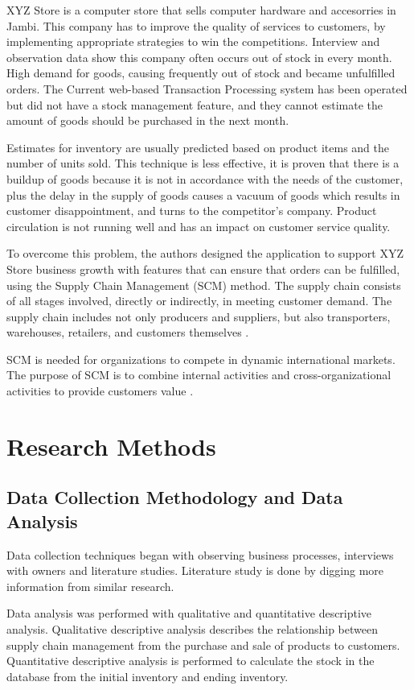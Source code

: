 \documentclass[12pt,a4paper,final]{iopart}
\begin{document}
XYZ Store is a computer store that sells computer hardware and accesorries in Jambi. This company has to improve the quality of services to customers, by implementing appropriate strategies to win the competitions. Interview and observation data show this company often occurs out of stock in every month. High demand for goods, causing frequently out of stock and became unfulfilled orders. The Current web-based Transaction Processing system has been operated but did not have a stock management feature, and they cannot estimate the amount of goods should be purchased in the next month.

Estimates for inventory are usually predicted based on product items and the number of units sold. This technique is less effective, it is proven that there is a buildup of goods because it is not in accordance with the needs of the customer, plus the delay in the supply of goods causes a vacuum of goods which results in customer disappointment, and turns to the competitor's company. Product circulation is not running well and has an impact on customer service quality.

To overcome this problem, the authors designed the application to support XYZ Store business growth with features that can ensure that orders can be fulfilled, using the Supply Chain Management (SCM) method. The supply chain consists of all stages involved, directly or indirectly, in meeting customer demand. The supply chain includes not only producers and suppliers, but also transporters, warehouses, retailers, and customers themselves \cite{Sharma2012}.

SCM is needed for organizations to compete in dynamic international markets. The purpose of SCM is to combine internal activities and cross-organizational activities to provide customers value \cite{Habib2019}.

\section{Research Methods}
\subsection{Data Collection Methodology and Data Analysis}
Data collection techniques began with observing business processes, interviews with owners and literature studies. Literature study is done by digging more information from similar research.

Data analysis was performed with qualitative and quantitative descriptive analysis. Qualitative descriptive analysis describes the relationship between supply chain management from the purchase and sale of products to customers. Quantitative descriptive analysis is performed to calculate the stock in the database from the initial inventory and ending inventory.
\end{document}

